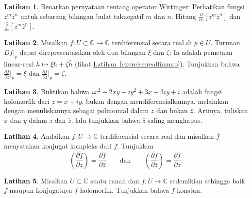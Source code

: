 \documentclass[12pt,openany]{book}
\newcommand{\C}{{\mathbb{C}}}
\theoremstyle{plain}
\theoremstyle{remark}
\theoremstyle{definition}
\newenvironment{exbox}{%
    \def\FrameCommand{\vrule width 1pt \relax\hspace{10pt}}%
    \MakeFramed{\advance\hsize-\width\FrameRestore}%
}{%
    \endMakeFramed
}
\theoremstyle{exercise}
\newtheorem{exercise}{Latihan}[section]
\theoremstyle{example}
\newcommand{\exerciseref}[1]{\hyperref[#1]{Latihan~\ref*{#1}}}
\begin{document}
\begin{exbox}
\begin{exercise}
Benarkan pernyataan tentang operator Wirtinger: Perhatikan
fungsi $z^m\bar{z}^n$ untuk sebarang bilangan bulat taknegatif $m$ dan $n$.
Hitung
$\frac{\partial}{\partial z} \left[ z^m\bar{z}^n \right]$
dan
$\frac{\partial}{\partial \bar{z}} \left[ z^m\bar{z}^n \right]$.
\end{exercise}

\begin{exercise}
Misalkan $f \colon U \subset \C \to \C$ terdiferensial secara real di $p \in U$.
Turunan $Df|_{p}$ dapat direpresentasikan oleh dua bilangan $\xi$ dan
$\zeta$: Ia adalah pemetaan linear-real $h \mapsto \xi h + \zeta \bar{h}$
(lihat \exerciseref{exercise:reallinmap}).
Tunjukkan bahwa $\frac{\partial f}{\partial z} \big|_p = \xi$ dan
$\frac{\partial f}{\partial \bar{z}} \big|_p = \zeta$.
\end{exercise}

\begin{exercise}
Buktikan bahwa $ix^2 - 2xy -iy^2 + 3x + 3iy + i$ adalah fungsi holomorfik dari
$z = x+iy$, bukan dengan
mendiferensialkannya, melainkan dengan menuliskannya sebagai polinomial dalam $z$ dan bukan $\bar{z}$.
Artinya, tuliskan $x$ dan $y$ dalam $z$ dan $\bar{z}$, lalu tunjukkan
bahwa $\bar{z}$ saling menghapus.
\end{exercise}

\begin{exercise}%
\label{exercise:wirtingerandbar}
Andaikan $f \colon U \to \C$ terdiferensial secara real dan misalkan $\bar{f}$
menyatakan konjugat kompleks dari $f$.  Tunjukkan
\begin{equation*}
\overline{\left(\frac{\partial f}{\partial z}\right)} = 
\frac{\partial \bar{f}}{\partial \bar{z}}
\qquad \text{dan} \qquad
\overline{\left(\frac{\partial f}{\partial \bar{z}}\right)} = 
\frac{\partial \bar{f}}{\partial z} .
\end{equation*}
\end{exercise}

\begin{exercise}
Misalkan $U \subset \C$ suatu ranah dan
$f \colon U \to \C$ sedemikian sehingga baik $f$ maupun konjugatnya
$\bar{f}$ holomorfik.  Tunjukkan bahwa $f$ konstan.
\end{exercise}


\end{exbox}
\end{document}
